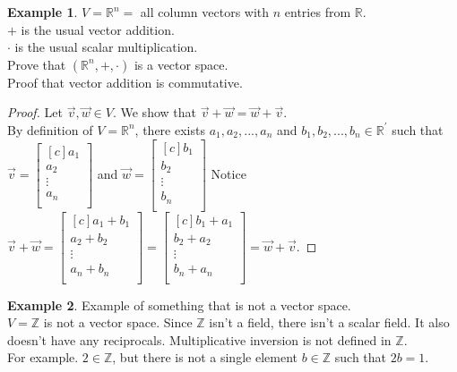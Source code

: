 \documentclass{report}
\newcommand{\Z}{\mathbb{Z}}
\theoremstyle{plain}
\theoremstyle{definition}
\newtheorem*{ex}{Example}
\theoremstyle{plain}
\begin{document}
\begin{ex}
$V= \mathbb{R}^n =$ all column vectors with $n$ entries from $\mathbb{R}$.\\
$+$ is the usual vector addition.\\
$\cdot$ is the usual scalar multiplication.\\
Prove that $(\mathbb{R}^n,+,\cdot)$ is a vector space.\\
Proof that vector addition is commutative.
\begin{proof}
	Let $\vec{v}, \vec{w} \in V$. We show that $\vec{v} + \vec{w} = \vec{w} + \vec{v}$.\\
	By definition of $V=\mathbb{R}^n$, there exists $a_1,a_2,...,a_n$ and $b_1,b_2,...,b_n \in \mathbb{R}^\prime$ such that $\vec{v} = \begin{bmatrix}[c] a_1\\ a_2\\ \vdots\\ a_n\\ \end{bmatrix}$ and $\vec{w} = \begin{bmatrix}[c] b_1\\ b_2\\ \vdots\\ b_n\\ \end{bmatrix}$
	Notice $\vec{v} + \vec{w} = \begin{bmatrix}[c] a_1+b_1\\ a_2+b_2\\ \vdots\\ a_n+b_n\\ \end{bmatrix} = \begin{bmatrix}[c] b_1+a_1\\ b_2+a_2\\ \vdots\\ b_n+a_n\\ \end{bmatrix} = \vec{w} + \vec{v}$. 
\end{proof}
\end{ex}

\begin{ex}
Example of something that is not a vector space.\\
$V=\Z$ is not a vector space. Since $\Z$ isn't a field, there isn't a scalar field. It also doesn't have any reciprocals. Multiplicative inversion is not defined in $\Z$.\\
For example. $2 \in \Z$, but there is not a single element $b \in \Z$ such that $2b = 1$.
\end{ex}
\end{document}
